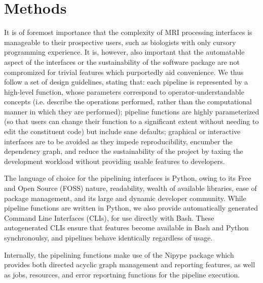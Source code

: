 \section{Methods}
It is of foremost importance that the complexity of MRI processing interfaces is manageable to their prospective users, such as biologists with only cursory programming experience.
It is, however, also important that the automatable aspect of the interfaces or the sustainability of the software package are not compromized for trivial features which purportedly aid convenience. 
We thus follow  a set of design guidelines, stating that:
each pipeline is represented by a high-level function, whose parameters correspond to operator-understandable concepts (i.e. describe the operations performed, rather than the computational manner in which they are performed); 
pipeline functions are highly parameterized (so that users can change their function to a significant extent without needing to edit the constituent code) but include sane defaults;
graphical or interactive interfaces are to be avoided as they impede reproducibility, encumber the dependency graph, and reduce the sustainability of the project by taxing the development workload without providing usable features to developers.

The language of choice for the pipelining interfaces is Python, owing to its Free and Open Source (FOSS) nature, readability, wealth of available libraries, ease of package management, and its large and dynamic developer community.
While pipeline functions are written in Python, we also provide automatically generated Command Line Interfaces (CLIs), for use directly with Bash.
These autogenerated CLIs ensure that features become available in Bash and Python synchronoulsy, and pipelines behave identically regardless of usage.

Internally, the pipelining functions make use of the Nipype package which provides both directed acyclic graph management and reporting features, as well as jobs, resources, and error reportning functions for the pipeline execution. 

\begin{figure*}
\end{figure*}
